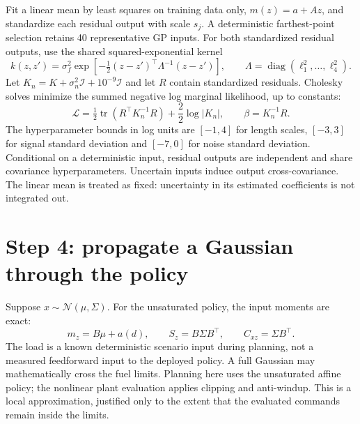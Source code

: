 Fit a linear mean by least squares on training data only, $m(z)=a+Az$, and standardize each residual output with scale $s_j$. A deterministic farthest-point selection retains 40 representative GP inputs. For both standardized residual outputs, use the shared squared-exponential kernel
\begin{equation}
 k(z,z')=\sigma_f^2\exp\left[-\tfrac12(z-z')^\top\Lambda^{-1}(z-z')\right],\qquad
 \Lambda=\operatorname{diag}(\ell_1^2,\ldots,\ell_4^2).
\end{equation}
Let $K_n=K+\sigma_n^2\mathcal I+10^{-9}\mathcal I$ and let $R$ contain standardized residuals. Cholesky solves minimize the summed negative log marginal likelihood, up to constants:
\begin{equation}
 \mathcal L=\tfrac12\operatorname{tr}(R^\top K_n^{-1}R)+\frac{2}{2}\log|K_n|,\qquad \beta=K_n^{-1}R.
\end{equation}
The hyperparameter bounds in log units are $[-1,4]$ for length scales, $[-3,3]$ for signal standard deviation and $[-7,0]$ for noise standard deviation. Conditional on a deterministic input, residual outputs are independent and share covariance hyperparameters. Uncertain inputs induce output cross-covariance. The linear mean is treated as fixed: uncertainty in its estimated coefficients is not integrated out.

\section{Step 4: propagate a Gaussian through the policy}
Suppose $x\sim\mathcal N(\mu,\Sigma)$. For the unsaturated policy, the input moments are exact:
\begin{equation}
 m_z=B\mu+a(d),\qquad S_z=B\Sigma B^\top,\qquad C_{xz}=\Sigma B^\top.
\end{equation}
The load is a known deterministic scenario input during planning, not a measured feedforward input to the deployed policy. A full Gaussian may mathematically cross the fuel limits. Planning here uses the unsaturated affine policy; the nonlinear plant evaluation applies clipping and anti-windup. This is a local approximation, justified only to the extent that the evaluated commands remain inside the limits.

